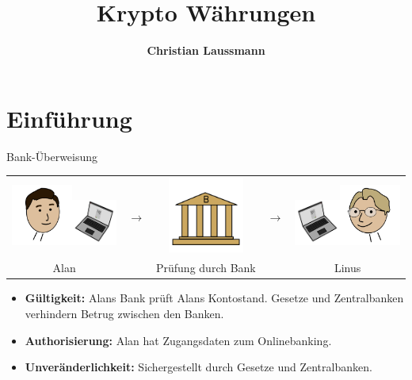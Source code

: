 \documentclass[aspectratio=169]{beamer}
\title{\textbf{\Huge Krypto Währungen}}
\author{\textcolor{secondarycolor}{\textbf{Christian Laussmann}}}
\date{}
\begin{document}
\frame{\titlepage}





\section{Einführung}

\begin{frame}{Bank-Überweisung}
    \begin{center}
        \begin{tabular}{ccccc}
            \includegraphics[width=2cm]{../icons/Alan}\includegraphics[width=1.5cm]{../icons/ComputerLeft} & {\Huge$\longrightarrow$} & \includegraphics[width=2.5cm]{../icons/Bank} & {\Huge$\longrightarrow$} & \includegraphics[width=1.5cm]{../icons/ComputerRight}\includegraphics[width=2cm]{../icons/Linus}\\
            Alan & & Prüfung durch Bank & & Linus\\
        \end{tabular}
    \end{center}
    \vspace{0.5cm}

    \pause
    \begin{itemize}
        \item \textbf{Gültigkeit:} Alans Bank prüft Alans Kontostand. Gesetze und Zentralbanken verhindern Betrug zwischen den Banken.
        \item \textbf{Authorisierung:} Alan hat Zugangsdaten zum Onlinebanking.
        \item \textbf{Unveränderlichkeit:} Sichergestellt durch Gesetze und Zentralbanken.
    \end{itemize}
\end{frame}
\end{document}
